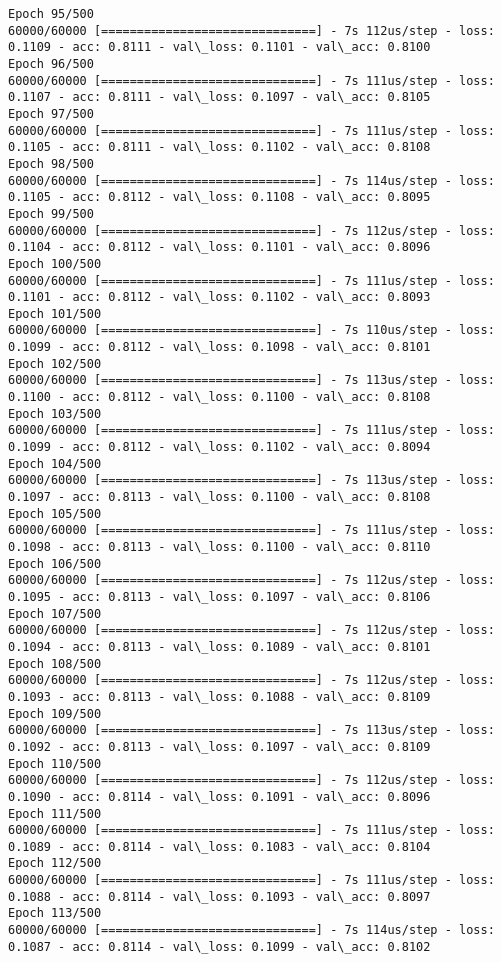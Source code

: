 \documentclass[11pt]{article}
\begin{document}
\begin{Verbatim}[commandchars=\\\{\}]
Epoch 95/500
60000/60000 [==============================] - 7s 112us/step - loss: 0.1109 - acc: 0.8111 - val\_loss: 0.1101 - val\_acc: 0.8100
Epoch 96/500
60000/60000 [==============================] - 7s 111us/step - loss: 0.1107 - acc: 0.8111 - val\_loss: 0.1097 - val\_acc: 0.8105
Epoch 97/500
60000/60000 [==============================] - 7s 111us/step - loss: 0.1105 - acc: 0.8111 - val\_loss: 0.1102 - val\_acc: 0.8108
Epoch 98/500
60000/60000 [==============================] - 7s 114us/step - loss: 0.1105 - acc: 0.8112 - val\_loss: 0.1108 - val\_acc: 0.8095
Epoch 99/500
60000/60000 [==============================] - 7s 112us/step - loss: 0.1104 - acc: 0.8112 - val\_loss: 0.1101 - val\_acc: 0.8096
Epoch 100/500
60000/60000 [==============================] - 7s 111us/step - loss: 0.1101 - acc: 0.8112 - val\_loss: 0.1102 - val\_acc: 0.8093
Epoch 101/500
60000/60000 [==============================] - 7s 110us/step - loss: 0.1099 - acc: 0.8112 - val\_loss: 0.1098 - val\_acc: 0.8101
Epoch 102/500
60000/60000 [==============================] - 7s 113us/step - loss: 0.1100 - acc: 0.8112 - val\_loss: 0.1100 - val\_acc: 0.8108
Epoch 103/500
60000/60000 [==============================] - 7s 111us/step - loss: 0.1099 - acc: 0.8112 - val\_loss: 0.1102 - val\_acc: 0.8094
Epoch 104/500
60000/60000 [==============================] - 7s 113us/step - loss: 0.1097 - acc: 0.8113 - val\_loss: 0.1100 - val\_acc: 0.8108
Epoch 105/500
60000/60000 [==============================] - 7s 111us/step - loss: 0.1098 - acc: 0.8113 - val\_loss: 0.1100 - val\_acc: 0.8110
Epoch 106/500
60000/60000 [==============================] - 7s 112us/step - loss: 0.1095 - acc: 0.8113 - val\_loss: 0.1097 - val\_acc: 0.8106
Epoch 107/500
60000/60000 [==============================] - 7s 112us/step - loss: 0.1094 - acc: 0.8113 - val\_loss: 0.1089 - val\_acc: 0.8101
Epoch 108/500
60000/60000 [==============================] - 7s 112us/step - loss: 0.1093 - acc: 0.8113 - val\_loss: 0.1088 - val\_acc: 0.8109
Epoch 109/500
60000/60000 [==============================] - 7s 113us/step - loss: 0.1092 - acc: 0.8113 - val\_loss: 0.1097 - val\_acc: 0.8109
Epoch 110/500
60000/60000 [==============================] - 7s 112us/step - loss: 0.1090 - acc: 0.8114 - val\_loss: 0.1091 - val\_acc: 0.8096
Epoch 111/500
60000/60000 [==============================] - 7s 111us/step - loss: 0.1089 - acc: 0.8114 - val\_loss: 0.1083 - val\_acc: 0.8104
Epoch 112/500
60000/60000 [==============================] - 7s 111us/step - loss: 0.1088 - acc: 0.8114 - val\_loss: 0.1093 - val\_acc: 0.8097
Epoch 113/500
60000/60000 [==============================] - 7s 114us/step - loss: 0.1087 - acc: 0.8114 - val\_loss: 0.1099 - val\_acc: 0.8102

\end{Verbatim}
\end{document}

